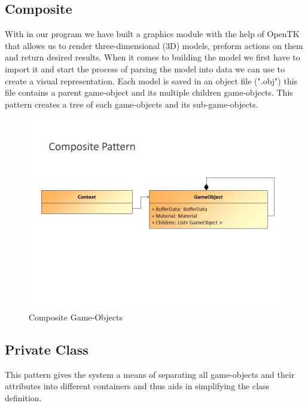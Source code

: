 
\subsection{Composite}
With in our program we have built a graphics module with the help of OpenTK that allows us to render three-dimensional (3D) models, preform actions on them and return desired results. When it comes to building the model we first have to import it and start the process of parsing the model into data we can use to create a visual representation. Each model is saved in an object file (".obj") this file contains a parent game-object and its multiple children game-objects. This pattern creates a tree of each game-objects and its sub-game-objects.

\begin{figure}[!ht]
	\centering
	\includegraphics[scale=0.5]{Diagrams/Slide4.jpg}
	\caption{Composite Game-Objects}
\end{figure}


\subsection{Private Class}
This pattern gives the system a means of separating all game-objects and their attributes into different containers and thus aids in simplifying the class definition.

